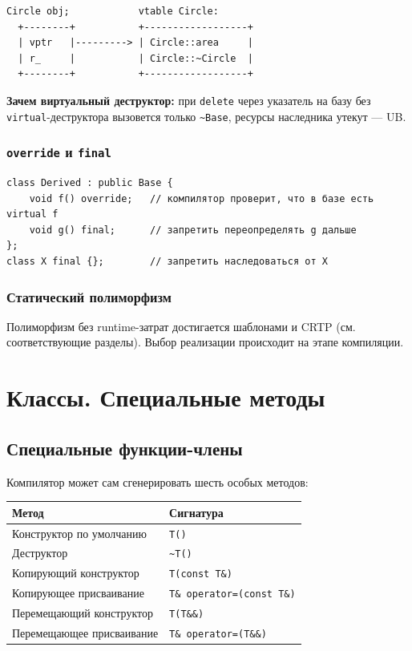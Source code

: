 \begin{lstlisting}[numbers=none]
Circle obj;            vtable Circle:
  +--------+           +------------------+
  | vptr   |---------> | Circle::area     |
  | r_     |           | Circle::~Circle  |
  +--------+           +------------------+
\end{lstlisting}

\textbf{Зачем виртуальный деструктор:} при \texttt{delete} через указатель на
базу без \texttt{virtual}-деструктора вызовется только \texttt{\textasciitilde Base},
ресурсы наследника утекут --- UB.

\subsubsection{\texttt{override} и \texttt{final}}

\begin{lstlisting}
class Derived : public Base {
    void f() override;   // компилятор проверит, что в базе есть virtual f
    void g() final;      // запретить переопределять g дальше
};
class X final {};        // запретить наследоваться от X
\end{lstlisting}

\subsubsection{Статический полиморфизм}

Полиморфизм без runtime-затрат достигается шаблонами и CRTP (см. соответствующие
разделы). Выбор реализации происходит на этапе компиляции.


\section{Классы. Специальные методы}

\subsection{Специальные функции-члены}

Компилятор может сам сгенерировать шесть особых методов:

\begin{center}
\begin{tabular}{lp{8cm}}
\toprule
\textbf{Метод} & \textbf{Сигнатура} \\
\midrule
Конструктор по умолчанию & \texttt{T()} \\
Деструктор               & \texttt{\textasciitilde T()} \\
Копирующий конструктор   & \texttt{T(const T\&)} \\
Копирующее присваивание  & \texttt{T\& operator=(const T\&)} \\
Перемещающий конструктор & \texttt{T(T\&\&)} \\
Перемещающее присваивание & \texttt{T\& operator=(T\&\&)} \\
\bottomrule
\end{tabular}
\end{center}

